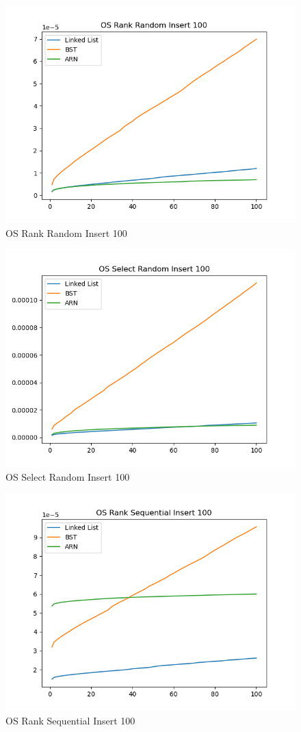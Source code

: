 \documentclass[11pt]{article}
\begin{document}
\begin{figure}[H]
  \centering
  \includegraphics[width=0.8\linewidth]{Images/100/OS Rank Random Insert 100.png}
  \caption{OS Rank Random Insert 100}
  \label{fig:OS Rank Random Insert 100}
  \end{figure}
  \begin{figure}[H]
  \centering
  \includegraphics[width=0.8\linewidth]{Images/100/OS Select Random Insert 100.png}
  \caption{OS Select Random Insert 100}
  \label{fig:OS Select Random Insert 100}
\end{figure}
 \begin{figure}[H]
  \centering
  \includegraphics[width=0.8\linewidth]{Images/100/OS Rank Sequential Insert 100.png}
  \caption{OS Rank Sequential Insert 100 }
  \label{fig:OS Rank Sequential Insert 100}
\end{figure}
\end{document}
